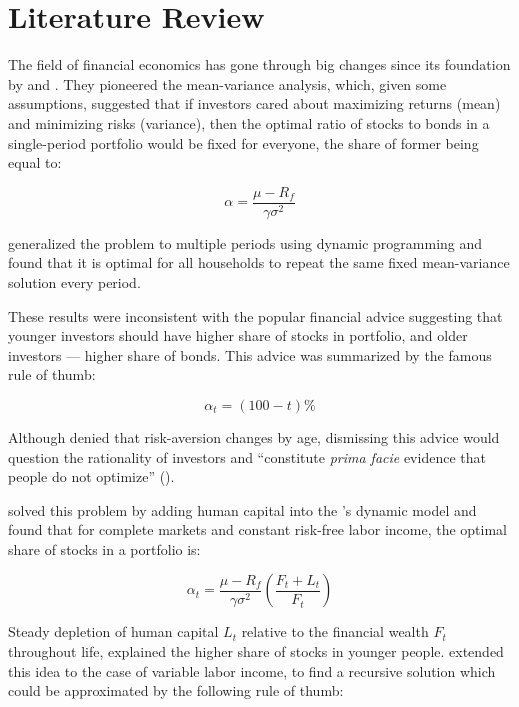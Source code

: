 \chapter{Literature Review} %
\label{litreview} %

The field of financial economics has gone through big changes since its foundation by \citet{markowitz} and \citet{tobin}. They pioneered the mean-variance analysis, which, given some assumptions, suggested that if investors cared about maximizing returns (mean) and minimizing risks (variance), then the optimal ratio of stocks to bonds in a single-period portfolio would be fixed for everyone, the share of former being equal to:

\begin{equation}\label{eq:markowitz}
	\alpha = \frac{\mu - R_f}{\gamma\sigma^2}
\end{equation}

\citet{merton} generalized the problem to multiple periods using dynamic programming and found that it is optimal for all households to repeat the same fixed mean-variance solution every period.

\paraphraph{}These results were inconsistent with the popular financial advice suggesting that younger investors should have higher share of stocks in portfolio, and older investors --- higher share of bonds. This advice was summarized by the famous rule of thumb:

\begin{equation}\label{eq:stominus}
	\alpha_t = (100 - t)\%
\end{equation}

Although \citet{samuelson} denied that risk-aversion changes by age, dismissing this advice would question the rationality of investors and ``constitute \textit{prima facie} evidence that people do not optimize'' (\citet{canner}).

\paraphraph{}\citet{bodie} solved this problem by adding human capital into the \citet{merton}'s dynamic model and found that for complete markets and constant risk-free labor income, the optimal share of stocks in a portfolio is:

\begin{equation}\label{eq:bodie}
	\alpha_t = \frac{\mu - R_f}{\gamma \sigma^2} \left( \frac{F_t + L_t}{F_t} \right)
\end{equation}

Steady depletion of human capital $L_t$ relative to the financial wealth $F_t$ throughout life, explained the higher share of stocks in younger people. \citet{cgm} extended this idea to the case of variable labor income, to find a recursive solution which could be approximated by the following rule of thumb:

